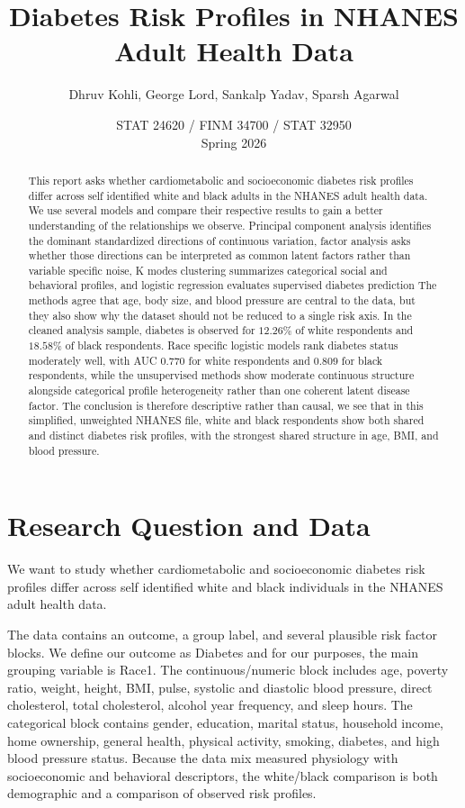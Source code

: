 \documentclass[10pt]{article}
\title{\vspace{-0.6cm}Diabetes Risk Profiles in NHANES Adult Health Data\vspace{-0.25cm}}
\author{Dhruv Kohli, George Lord, Sankalp Yadav, Sparsh Agarwal}
\date{STAT 24620 / FINM 34700 / STAT 32950 \\ Spring 2026}
\begin{document}
\maketitle
\vspace{-0.35cm}

\begin{abstract}
This report asks whether cardiometabolic and socioeconomic diabetes risk profiles differ across self identified white and black adults in the NHANES adult health data. We use several models and compare their respective results to gain a better understanding of the relationships we observe.
Principal component analysis identifies the dominant standardized directions of continuous variation, factor analysis asks whether those directions can be interpreted as common latent factors rather than variable specific noise, K modes clustering summarizes categorical social and behavioral profiles, and logistic regression evaluates supervised diabetes prediction
The methods agree that age, body size, and blood pressure are central to the data, but they also show why the dataset should not be reduced to a single risk axis. In the cleaned analysis sample, diabetes is observed for $12.26\%$ of white respondents and $18.58\%$ of black respondents. Race specific logistic models rank diabetes status moderately well,
with AUC $0.770$ for white respondents and $0.809$ for black respondents, while the unsupervised methods show moderate continuous structure alongside categorical profile heterogeneity rather than one coherent latent disease factor. The conclusion is therefore descriptive rather than causal, we see that in this simplified, unweighted NHANES file,
white and black respondents show both shared and distinct diabetes risk profiles, with the strongest shared structure in age, BMI, and blood pressure.
\end{abstract}

\section{Research Question and Data}

We want to study whether cardiometabolic and socioeconomic diabetes risk profiles differ across self identified white and black individuals in the NHANES adult health data.

The data contains an outcome, a group label, and several plausible risk factor blocks.
We define our outcome as {Diabetes} and for our purposes, the main grouping variable is {Race1}.
The continuous/numeric block includes age, poverty ratio, weight, height, BMI, pulse, systolic and diastolic blood pressure, direct cholesterol, total cholesterol, alcohol year frequency, and sleep hours.
The categorical block contains gender, education, marital status, household income, home ownership, general health, physical activity, smoking, diabetes, and high blood pressure status.
Because the data mix measured physiology with socioeconomic and behavioral descriptors, the white/black comparison is both demographic and a comparison of observed risk profiles.
\end{document}

